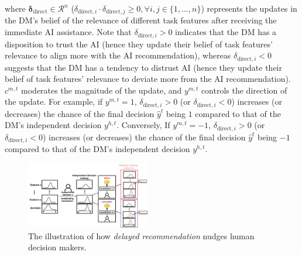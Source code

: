 \documentclass[letterpaper]{article} %
\begin{document}
\noindent where $\bm{\delta}_{\text{direct}} \in \mathcal{R}^n$ ($\delta_{\text{direct},i} \cdot \delta_{\text{direct},j} \geq 0,  \forall i, j \in \{1, \dots, n\}
$) represents the updates in the DM's belief of the relevance of different task features after receiving the immediate AI assistance. Note that $\delta_{\text{direct},i}>0$ indicates that the DM has a disposition to trust the AI (hence they update their belief of task features' relevance to align more with the AI recommendation), whereas $\delta_{\text{direct},i}<0$  suggests that the DM has a tendency to distrust AI (hence they update their belief of task features' relevance to deviate more from the AI recommendation). $c^{m,t}$ moderates the magnitude of the update, 
and $y^{m,t}$ controls the direction of the update. For example, if $y^{m,t} = 1$, $\delta_{\text{direct},i}>0$ (or $\delta_{\text{direct},i}<0$) increases (or decreases) the chance of the final decision $\hat{y}^t$ being $1$ compared to that of the DM's independent decision $y^{h, t}$. 
Conversely,
If $y^{m,t} = -1$, $\delta_{\text{direct},i}>0$ (or $\delta_{\text{direct},i}<0$) increases (or decreases) the chance of the final decision $\hat{y}^t$ being $-1$
compared to that of the DM's independent decision $y^{h, t}$.
\begin{figure}[th]
    \centering
        \includegraphics[width=0.48\textwidth]{figures/two_step.png}
  
    \caption{The illustration of how {\em delayed recommendation} nudges human decision makers. }
    \label{fig:ill_two_step}
\end{figure}
\end{document}
